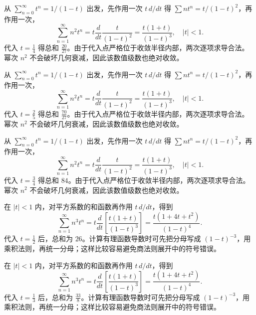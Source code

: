 \documentclass[UTF8,12pt,a4paper,fontset=fandol]{ctexart}
\begin{document}
\begin{solve}\label{ans:c27q4}
从 $\sum_{n=0}^\infty t^n=1/(1-t)$ 出发，先作用一次 $t\,d/dt$ 得 $\sum nt^n=t/(1-t)^2$，再作用一次，
\[
\sum_{n=1}^\infty n^2t^n=t\frac d{dt}\frac{t}{(1-t)^2}=\frac{t(1+t)}{(1-t)^3},\quad |t|<1.
\]
代入 $t=\frac{1}{4}$ 得总和 $\frac{20}{27}$。由于代入点严格位于收敛半径内部，两次逐项求导合法。幂次 $n^2$ 不会破坏几何衰减，因此该数值级数也绝对收敛。
\end{solve}

\begin{solve}\label{ans:c27q5}
从 $\sum_{n=0}^\infty t^n=1/(1-t)$ 出发，先作用一次 $t\,d/dt$ 得 $\sum nt^n=t/(1-t)^2$，再作用一次，
\[
\sum_{n=1}^\infty n^2t^n=t\frac d{dt}\frac{t}{(1-t)^2}=\frac{t(1+t)}{(1-t)^3},\quad |t|<1.
\]
代入 $t=\frac{2}{5}$ 得总和 $\frac{70}{27}$。由于代入点严格位于收敛半径内部，两次逐项求导合法。幂次 $n^2$ 不会破坏几何衰减，因此该数值级数也绝对收敛。
\end{solve}

\begin{solve}\label{ans:c27q6}
从 $\sum_{n=0}^\infty t^n=1/(1-t)$ 出发，先作用一次 $t\,d/dt$ 得 $\sum nt^n=t/(1-t)^2$，再作用一次，
\[
\sum_{n=1}^\infty n^2t^n=t\frac d{dt}\frac{t}{(1-t)^2}=\frac{t(1+t)}{(1-t)^3},\quad |t|<1.
\]
代入 $t=\frac{3}{4}$ 得总和 $84$。由于代入点严格位于收敛半径内部，两次逐项求导合法。幂次 $n^2$ 不会破坏几何衰减，因此该数值级数也绝对收敛。
\end{solve}

\begin{solve}\label{ans:c27q7}
在 $|t|<1$ 内，对平方系数的和函数再作用 $t\,d/dt$，得到
\[
\sum_{n=1}^\infty n^3t^n=t\frac d{dt}\left[\frac{t(1+t)}{(1-t)^3}\right]=\frac{t(1+4t+t^2)}{(1-t)^4}.
\]
代入 $t=\frac{1}{2}$ 后，总和为 $26$。计算有理函数导数时可先把分母写成 $(1-t)^{-3}$，用乘积法则，再统一分母；这样比较容易避免商法则展开中的符号错误。
\end{solve}

\begin{solve}\label{ans:c27q8}
在 $|t|<1$ 内，对平方系数的和函数再作用 $t\,d/dt$，得到
\[
\sum_{n=1}^\infty n^3t^n=t\frac d{dt}\left[\frac{t(1+t)}{(1-t)^3}\right]=\frac{t(1+4t+t^2)}{(1-t)^4}.
\]
代入 $t=\frac{1}{3}$ 后，总和为 $\frac{33}{8}$。计算有理函数导数时可先把分母写成 $(1-t)^{-3}$，用乘积法则，再统一分母；这样比较容易避免商法则展开中的符号错误。
\end{solve}
\end{document}

